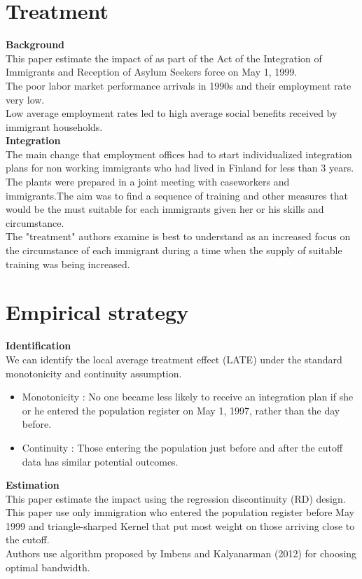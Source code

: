 \documentclass[../root]{subfiles}
\begin{document}
    \section{Treatment}
    {\bf Background} \\
    This paper estimate the impact of as part of the Act of the Integration of Immigrants and Reception of Asylum Seekers force on May 1, 1999. \\
    The poor labor market performance arrivals in 1990s and their employment rate very low. 　\\
    Low average employment rates led to high average social benefits received by immigrant households. \\
    {\bf Integration} \\
    The main change that employment offices had to start individualized  integration plans for non working immigrants who had lived in Finland for less than 3 years.  \\
    The plants were prepared in a joint meeting with caseworkers and immigrants.The aim was to find a sequence of training and other measures that would be the must suitable for each immigrants given her or his skills and circumstance. 　\\
    The "treatment" authors examine is best to understand as an increased focus on the circumstance of each immigrant during a time when the supply of suitable training was being increased. 
    
    
    \section{Empirical strategy}
    {\bf Identification} \\
    We can identify the local average treatment effect (LATE) under the standard monotonicity and continuity assumption.
    
    \begin{itemize}
        \item Monotonicity : No one became less likely to receive an integration plan if she or he entered the population register on May 1, 1997, rather than the day before.
        \item Continuity : Those entering the population  just before and after the cutoff data has similar potential outcomes.
    \end{itemize}
    
    {\bf Estimation} \\
    This paper estimate the impact using the regression discontinuity (RD) design. \\
    This paper use only immigration who entered the population register before May 1999 and triangle-sharped Kernel that put most weight on those arriving close to the cutoff. \\
    Authors use algorithm proposed by Imbens and Kalyanarman (2012) for choosing  optimal bandwidth. \\
    
\end{document}
